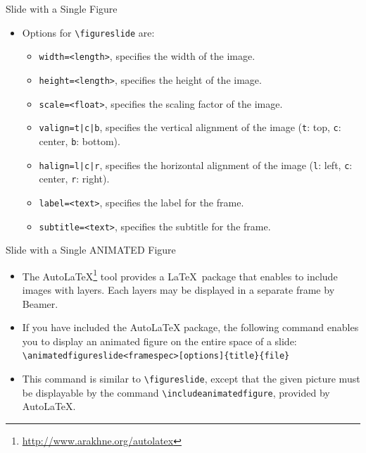 \documentclass[english,sectioncirclenumberstyle]{ciadbeamer}
\begin{document}
\begin{frame}{Slide with a Single Figure \insertcontinuationtext}
	\begin{itemize}
	\item Options for \texttt{{\textbackslash}figureslide} are:
		\begin{itemize}
		\item \texttt{width=<length>}, specifies the width of the image.
		\vfill
		\item \texttt{height=<length>}, specifies the height of the image.
		\vfill
		\item \texttt{scale=<float>}, specifies the scaling factor of the image.
		\vfill
		\item \texttt{valign=t|c|b}, specifies the vertical alignment of the image (\texttt{t}: top, \texttt{c}: center, \texttt{b}: bottom).
		\vfill
		\item \texttt{halign=l|c|r}, specifies the horizontal alignment of the image (\texttt{l}: left, \texttt{c}: center, \texttt{r}: right).
		\vfill
		\item \texttt{label=<text>}, specifies the label for the frame.
		\vfill
		\item \texttt{subtitle=<text>}, specifies the subtitle for the frame.
		\end{itemize}
	\end{itemize}
\end{frame}


\begin{frame}{Slide with a Single ANIMATED Figure}
	\begin{itemize}
	\item The AutoLaTeX\footnote{\url{http://www.arakhne.org/autolatex}} tool provides a \LaTeX\ package that enables to include images with layers. Each layers may be displayed in a separate frame by Beamer.
	\vfill
	\item If you have included the AutoLaTeX package, the following command enables you to display an animated figure on the entire space of a slide: \\
		\texttt{{\textbackslash}animatedfigureslide<framespec>[options]\{title\}\{file\}}
	\item This command is similar to \texttt{{\textbackslash}figureslide}, except that the given picture must be displayable by the command \texttt{{\textbackslash}includeanimatedfigure}, provided by AutoLaTeX.
	\end{itemize}
\end{frame}
\end{document}
